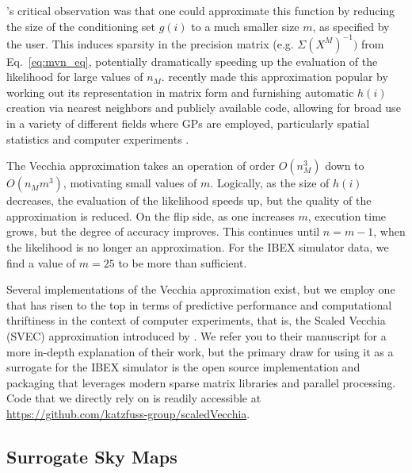 \documentclass[11pt]{article}
\begin{document}
\citeauthor{vecchia1988estimation}'s critical observation was that one could
approximate this function by reducing the size of the conditioning set $g(i)$ to
a much smaller size $m$, as specified by the user. This induces sparsity in the
precision matrix (e.g. $\Sigma(X^M)^{-1})$ from Eq.~\ref{eq:mvn_eq}, potentially
dramatically speeding up the evaluation of the likelihood for large values of
$n_M$. \citet{katzfuss2021general} recently made this approximation popular by
working out its representation in matrix form and furnishing automatic $h(i)$
creation via nearest neighbors and publicly available code, allowing for broad
use in a variety of different fields where GPs are employed, particularly
spatial statistics and computer experiments
\citep{guinness2018permutation,katzfuss2020vecchia,katzfuss2021general,zhang2022multi,sauer2023vecchia}.

The Vecchia approximation takes an operation of order $O(n_M^3)$ down to $O(n_M
m^3)$, motivating small values of $m$. Logically, as the size of $h(i)$
decreases, the evaluation of the likelihood speeds up, but the quality of the
approximation is reduced. On the flip side, as one increases $m$, execution
time grows, but the degree of accuracy improves. This continues until $n=m-1$,
when the likelihood is no longer an approximation. For the IBEX simulator data,
we find a value of $m=25$ to be more than sufficient.

Several implementations of the Vecchia approximation exist, but we employ one
that has risen to the top in terms of predictive performance and
computational thriftiness in the context of computer experiments, that is,
the Scaled Vecchia {\color{red}(SVEC)} approximation introduced by \citet
{scaledvecchiakatzfuss2022}. We refer you to their manuscript for a more
in-depth explanation of their work, but the primary draw for using it as a
surrogate for the IBEX simulator is the open source implementation and
packaging that leverages modern sparse matrix libraries and parallel
processing. Code that we directly rely on is readily accessible at
\url{https://github.com/katzfuss-group/scaledVecchia}.

\subsection{Surrogate Sky Maps}
\label{sec:surr_skymaps}
\end{document}
